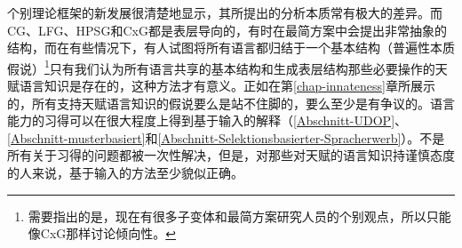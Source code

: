 个别理论框架的新发展很清楚地显示，其所提出的分析本质常有极大的差异。而CG、LFG、HPSG和CxG都是表层导向的，有时在最简方案中会提出非常抽象的结构，而在有些情况下，有人试图将所有语言都归结于一个基本结构（普遍性本质假说）\footnote{%
需要指出的是，现在有很多子变体和最简方案研究人员的个别观点，所以只能像CxG那样讨论倾向性。
}只有我们认为所有语言共享的基本结构和生成表层结构那些必要操作的天赋语言知识是存在的，这种方法才有意义。正如在第\ref{chap-innateness}章所展示的，所有支持天赋语言知识的假说要么是站不住脚的，要么至少是有争议的。语言能力的习得可以在很大程度上得到基于输入的解释（\ref{Abschnitt-UDOP}、\ref{Abschnitt-musterbasiert}和\ref{Abschnitt-Selektionsbasierter-Spracherwerb}）。不是所有关于习得的问题都被一次性解决，但是，对那些对天赋的语言知识持谨慎态度的人来说，基于输入的方法至少貌似正确。


